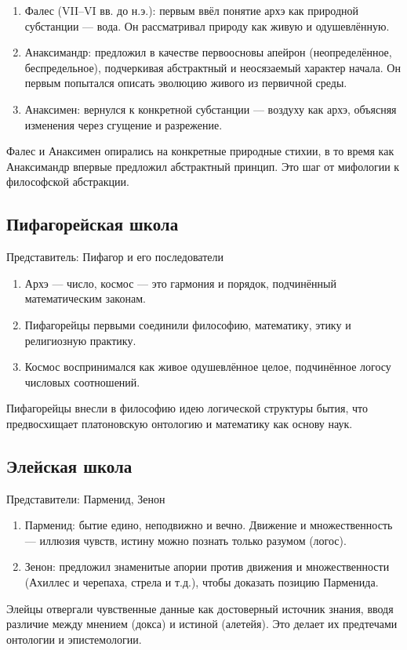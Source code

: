 \documentclass[12pt,a4paper]{article}
\begin{document}
	\begin{enumerate}
		\item Фалес (VII–VI вв. до н.э.): первым ввёл понятие архэ как природной субстанции — вода. Он рассматривал природу как живую и одушевлённую.
		\item Анаксимандр: предложил в качестве первоосновы апейрон (неопределённое, беспредельное), подчеркивая абстрактный и неосязаемый характер начала. Он первым попытался описать эволюцию живого из первичной среды.
		\item Анаксимен: вернулся к конкретной субстанции — воздуху как архэ, объясняя изменения через сгущение и разрежение.
	\end{enumerate}
	Фалес и Анаксимен опирались на конкретные природные стихии, в то время как Анаксимандр впервые предложил абстрактный принцип. Это шаг от мифологии к философской абстракции.
	
	\subsection{Пифагорейская школа}
	Представитель: Пифагор и его последователи
	
	\begin{enumerate}
		\item Архэ — число, космос — это гармония и порядок, подчинённый математическим законам.
		
		\item Пифагорейцы первыми соединили философию, математику, этику и религиозную практику.
		
		\item Космос воспринимался как живое одушевлённое целое, подчинённое логосу числовых соотношений.
	\end{enumerate}
	
	Пифагорейцы внесли в философию идею логической структуры бытия, что предвосхищает платоновскую онтологию и математику как основу наук.
	
	\subsection{Элейская школа}
	Представители: Парменид, Зенон
	\begin{enumerate}
		\item Парменид: бытие едино, неподвижно и вечно. Движение и множественность — иллюзия чувств, истину можно познать только разумом (логос).
		
		\item Зенон: предложил знаменитые апории против движения и множественности (Ахиллес и черепаха, стрела и т.д.), чтобы доказать позицию Парменида.
	\end{enumerate}
	Элейцы отвергали чувственные данные как достоверный источник знания, вводя различие между мнением (докса) и истиной (алетейя). Это делает их предтечами онтологии и эпистемологии.
	
\end{document}
